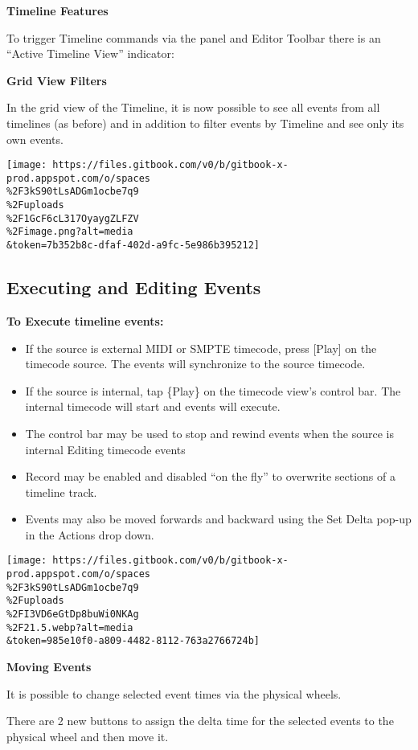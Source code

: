 \documentclass[
]{article}
\begin{document}
\textbf{Timeline Features}

To trigger Timeline commands via the panel and Editor Toolbar there is an ``Active Timeline View'' indicator:

\textbf{Grid View Filters}

In the grid view of the Timeline, it is now possible to see all events from all timelines (as before) and in addition to filter events by Timeline and see only its own events.

\texttt{[image: https://files.gitbook.com/v0/b/gitbook-x-prod.appspot.com/o/spaces\\\%2F3kS90tLsADGm1ocbe7q9\\\%2Fuploads\\\%2F1GcF6cL317OyaygZLFZV\\\%2Fimage.png?alt=media\\\&token=7b352b8c-dfaf-402d-a9fc-5e986b395212]}

\hypertarget{executing-and-editing-events}{%
\subsection{Executing and Editing Events}\label{executing-and-editing-events}}

\textbf{To Execute timeline events:}

\begin{itemize}
\item
  If the source is external MIDI or SMPTE timecode, press {[}Play{]} on the timecode source. The events will synchronize to the source timecode.
\item
  If the source is internal, tap \{Play\} on the timecode view's control bar. The internal timecode will start and events will execute.
\item
  The control bar may be used to stop and rewind events when the source is internal Editing timecode events
\item
  Record may be enabled and disabled ``on the fly'' to overwrite sections of a timeline track.
\item
  Events may also be moved forwards and backward using the Set Delta pop-up in the Actions drop down.
\end{itemize}

\texttt{[image: https://files.gitbook.com/v0/b/gitbook-x-prod.appspot.com/o/spaces\\\%2F3kS90tLsADGm1ocbe7q9\\\%2Fuploads\\\%2FI3VD6eGtDp8buWi0NKAg\\\%2F21.5.webp?alt=media\\\&token=985e10f0-a809-4482-8112-763a2766724b]}

\textbf{Moving Events}

It is possible to change selected event times via the physical wheels.

There are 2 new buttons to assign the delta time for the selected events to the physical wheel and then move it.
\end{document}
